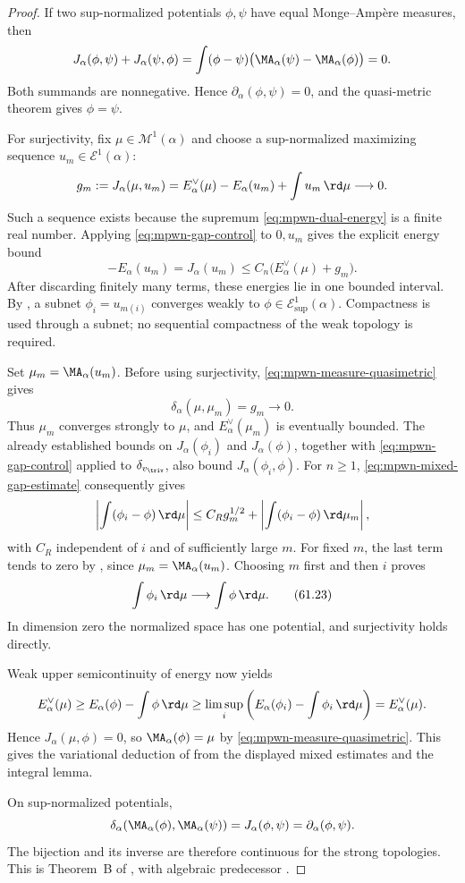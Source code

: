 \begin{proof}
If two sup-normalized potentials $\phi,\psi$ have equal
Monge--Amp\`ere measures, then
\[
 J_\alpha(\phi,\psi)+J_\alpha(\psi,\phi)
   =\int(\phi-\psi)
       \bigl(\MA_\alpha(\psi)-\MA_\alpha(\phi)\bigr)=0.
\]
Both summands are nonnegative.  Hence
$\partial_\alpha(\phi,\psi)=0$, and the quasi-metric theorem
gives $\phi=\psi$.

For surjectivity, fix $\mu\in\mathcal M^1(\alpha)$ and choose
a sup-normalized maximizing sequence $u_m\in\mathcal E^1(\alpha)$:
\[
 g_m:=J_\alpha(\mu,u_m)
      =E_\alpha^\vee(\mu)-E_\alpha(u_m)
                            +\int u_m\,\rd\mu\longrightarrow0.
\]
Such a sequence exists because the supremum
\eqref{eq:mpwn-dual-energy} is a finite real number.
Applying \eqref{eq:mpwn-gap-control} to $0,u_m$ gives the
explicit energy bound
\[
 -E_\alpha(u_m)=J_\alpha(u_m)
       \leq C_n\bigl(E_\alpha^\vee(\mu)+g_m\bigr).
\]
After discarding finitely many terms, these energies lie in
one bounded interval.  By ,
a subnet $\phi_i=u_{m(i)}$ converges weakly to
$\phi\in\mathcal E^1_{\sup}(\alpha)$.
Compactness is used through a subnet; no sequential compactness
of the weak topology is required.

Set $\mu_m=\MA_\alpha(u_m)$.  Before using surjectivity,
\eqref{eq:mpwn-measure-quasimetric} gives
\[
                   \delta_\alpha(\mu,\mu_m)=g_m\longrightarrow0.
\]
Thus $\mu_m$ converges strongly to $\mu$, and
$E_\alpha^\vee(\mu_m)$ is eventually bounded.
The already established bounds on $J_\alpha(\phi_i)$ and
$J_\alpha(\phi)$, together with \eqref{eq:mpwn-gap-control}
applied to $\delta_{v_{\triv}}$, also bound
$J_\alpha(\phi_i,\phi)$.
For $n\geq1$, \eqref{eq:mpwn-mixed-gap-estimate} consequently gives
\[
 \left|\int(\phi_i-\phi)\,\rd\mu\right|
 \leq C_R g_m^{1/2}
                  +\left|\int(\phi_i-\phi)\,\rd\mu_m\right|,
\]
with $C_R$ independent of $i$ and of sufficiently large $m$.
For fixed $m$, the last term tends to zero by
, since
$\mu_m=\MA_\alpha(u_m)$.  Choosing $m$ first and then $i$ proves
\[
                    \int\phi_i\,\rd\mu\longrightarrow\int\phi\,\rd\mu.
\tag{61.23}\label{eq:mpwn-maximizer-integral}
\]
In dimension zero the normalized space has one potential, and
surjectivity holds directly.

Weak upper semicontinuity of energy now yields
\[
 E_\alpha^\vee(\mu)
   \geq E_\alpha(\phi)-\int\phi\,\rd\mu
   \geq\limsup_i\left(E_\alpha(\phi_i)-\int\phi_i\,\rd\mu\right)
   =E_\alpha^\vee(\mu).
\]
Hence $J_\alpha(\mu,\phi)=0$, so
$\MA_\alpha(\phi)=\mu$ by
\eqref{eq:mpwn-measure-quasimetric}.
This gives the variational deduction of
\cite[Propositions~6.0.3--6.0.4]{MPWN25} from the displayed
mixed estimates and the integral lemma.

On sup-normalized potentials,
\[
 \delta_\alpha(\MA_\alpha(\phi),\MA_\alpha(\psi))
       =J_\alpha(\phi,\psi)=\partial_\alpha(\phi,\psi).
\]
The bijection and its inverse are therefore continuous for
the strong topologies.  This is Theorem~B of \cite{MPWN25},
with algebraic predecessor \cite[Theorem~12.8]{BJ22}.
\end{proof}


